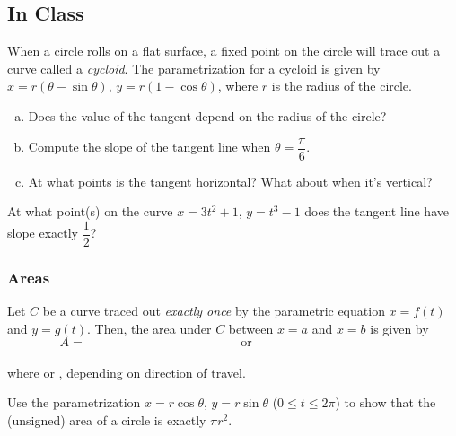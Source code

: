 \documentclass[notes2924]{subfiles}
\begin{document}
	\subsection*{In Class}
		
		\begin{ex}
			When a circle rolls on a flat surface, a fixed point on the circle will trace out a curve called a \emph{cycloid}.  The parametrization for a cycloid is given by $x = r(\theta - \sin\theta)$, $y = r(1-\cos\theta)$, where $r$ is the radius of the circle.  
			\begin{enumerate}[(a)]
				\item Does the value of the tangent depend on the radius of the circle?
					
				\item Compute the slope of the tangent line when $\theta = \dfrac{\pi}{6}$.
					
				\item At what points is the tangent horizontal?  What about when it's vertical?
			\end{enumerate}
		\end{ex}
		
		\begin{ex}
			At what point(s) on the curve $x = 3t^2 +1$, $y = t^3-1$ does the tangent line have slope exactly $\dfrac{1}{2}$?
		\end{ex}
			\vs{1}
			\newpage
			
	\subsubsection*{Areas}
		\begin{rmk}
			Let $C$ be a curve traced out \emph{exactly once} by the parametric equation $x = f(t)$ and $y = g(t)$.  Then, the area under $C$ between $x = a$ and $x = b$ is given by \\
				\[A = \hspace{2in}\text{ or }\hspace{2in} \] \\[40pt]
			where \blank{2} or , depending on direction of travel.
		\end{rmk}
		\begin{pf}
			
		\end{pf}	
			\vspace{1.5in}
			
		\begin{ex}
			Use the parametrization $x = r\cos\theta$, $y = r\sin\theta$ ($0\leq t\leq 2\pi$) to show that the (unsigned) area of a circle is exactly $\pi r^2$.
		\end{ex}
			
\end{document}
